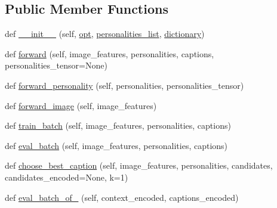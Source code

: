 \subsection*{Public Member Functions}
\begin{DoxyCompactItemize}
\item 
def \hyperlink{classprojects_1_1personality__captions_1_1transresnet_1_1modules_1_1TransresnetModel_ae1904b5e3a520e4637dd39d378a8419d}{\+\_\+\+\_\+init\+\_\+\+\_\+} (self, \hyperlink{classprojects_1_1personality__captions_1_1transresnet_1_1modules_1_1TransresnetModel_a13919d02a75fa59aebcd81ac27c133f2}{opt}, \hyperlink{classprojects_1_1personality__captions_1_1transresnet_1_1modules_1_1TransresnetModel_a166e8e99f9976b3774343ddc15a14fc7}{personalities\+\_\+list}, \hyperlink{classprojects_1_1personality__captions_1_1transresnet_1_1modules_1_1TransresnetModel_a92f8c4f0826beac705e067625611a582}{dictionary})
\item 
def \hyperlink{classprojects_1_1personality__captions_1_1transresnet_1_1modules_1_1TransresnetModel_a1a0d7d70271cf1cb881f3166bfd7bf10}{forward} (self, image\+\_\+features, personalities, captions, personalities\+\_\+tensor=None)
\item 
def \hyperlink{classprojects_1_1personality__captions_1_1transresnet_1_1modules_1_1TransresnetModel_a5d48e4824c4b82e8c7eb25431952e988}{forward\+\_\+personality} (self, personalities, personalities\+\_\+tensor)
\item 
def \hyperlink{classprojects_1_1personality__captions_1_1transresnet_1_1modules_1_1TransresnetModel_aee5f9d98e2c82024cc76dd1227c63f9e}{forward\+\_\+image} (self, image\+\_\+features)
\item 
def \hyperlink{classprojects_1_1personality__captions_1_1transresnet_1_1modules_1_1TransresnetModel_a65f01ee6cdfb2d516e1e9be77e3d141a}{train\+\_\+batch} (self, image\+\_\+features, personalities, captions)
\item 
def \hyperlink{classprojects_1_1personality__captions_1_1transresnet_1_1modules_1_1TransresnetModel_a5ae5dc90e1def32a45262dc7705e07a3}{eval\+\_\+batch} (self, image\+\_\+features, personalities, captions)
\item 
def \hyperlink{classprojects_1_1personality__captions_1_1transresnet_1_1modules_1_1TransresnetModel_a9f2a69ead8d29f468ec6c87fbf950b57}{choose\+\_\+best\+\_\+caption} (self, image\+\_\+features, personalities, candidates, candidates\+\_\+encoded=None, k=1)
\item 
def \hyperlink{classprojects_1_1personality__captions_1_1transresnet_1_1modules_1_1TransresnetModel_a0d96cec932912a3e06a44dc95259010a}{eval\+\_\+batch\+\_\+of\+\_} (self, context\+\_\+encoded, captions\+\_\+encoded)

\end{DoxyCompactItemize}
